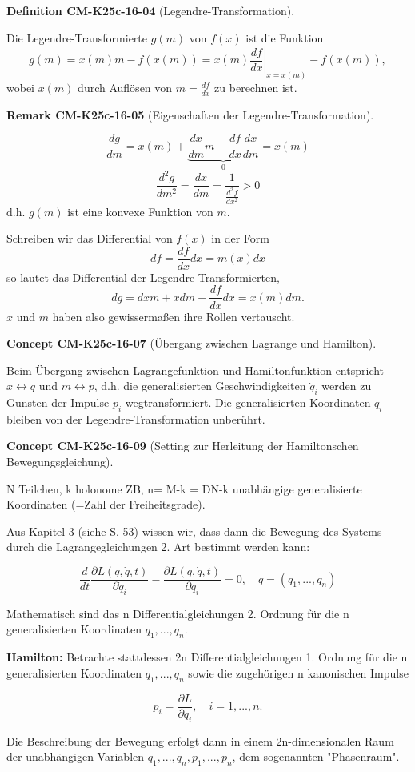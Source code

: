 \documentclass[10pt, letterpaper]{article}
\newcommand{\CustomHeading}[3]{%
  \par\medskip\noindent%
  \textbf{#1 #2} \textnormal{(#3)}.\enskip%
}
\newenvironment{DEF}[2]{\CustomHeading{Definition}{#1}{#2}}{}
\newenvironment{REM}[2]{\CustomHeading{Remark}{#1}{#2}}{}
\newenvironment{CONC}[2]{\CustomHeading{Concept}{#1}{#2}}{}
\begin{document}
\begin{DEF}{CM-K25c-16-04}{Legendre-Transformation}
Die Legendre-Transformierte $g(m)$ von $f(x)$ ist die Funktion
\[
g(m) = x(m)m - f(x(m)) = x(m)\left.\frac{df}{dx}\right|_{x=x(m)} - f(x(m)),
\]
wobei $x(m)$ durch Auflösen von $m = \frac{df}{dx}$ zu berechnen ist.
\end{DEF}

\begin{REM}{CM-K25c-16-05}{Eigenschaften der Legendre-Transformation}
\[
\frac{dg}{dm} = x(m) + \underbrace{\frac{dx}{dm}m - \frac{df}{dx}\frac{dx}{dm}}_{0} = x(m)
\]
\[
\frac{d^2g}{dm^2} = \frac{dx}{dm} = \frac{1}{\frac{d^2f}{dx^2}} > 0
\]
d.h. $g(m)$ ist eine konvexe Funktion von $m$.

Schreiben wir das Differential von $f(x)$ in der Form
\[
df = \frac{df}{dx}dx = m(x)dx
\]
so lautet das Differential der Legendre-Transformierten,
\[
dg = dxm + xdm - \frac{df}{dx}dx = x(m)dm.
\]
$x$ und $m$ haben also gewissermaßen ihre Rollen vertauscht.
\end{REM}

\begin{CONC}{CM-K25c-16-07}{Übergang zwischen Lagrange und Hamilton}
Beim Übergang zwischen Lagrangefunktion und Hamiltonfunktion entspricht $x \leftrightarrow q$ und $m \leftrightarrow p$, d.h. die generalisierten Geschwindigkeiten $\dot{q}_i$ werden zu Gunsten der Impulse $p_i$ wegtransformiert. Die generalisierten Koordinaten $q_i$ bleiben von der Legendre-Transformation unberührt.
\end{CONC}

\begin{CONC}{CM-K25c-16-09}{Setting zur Herleitung der Hamiltonschen Bewegungsgleichung}
N Teilchen, k holonome ZB, n= M-k = DN-k unabhängige generalisierte Koordinaten (=Zahl der Freiheitsgrade).

Aus Kapitel 3 (siehe S. 53) wissen wir, dass dann die Bewegung des Systems durch die Lagrangegleichungen 2. Art bestimmt werden kann:

\[
\frac{d}{dt} \frac{\partial L(q,\dot{q},t)}{\partial \dot{q}_i} - \frac{\partial L(q,\dot{q},t)}{\partial q_i} = 0, \quad q=(q_1,...,q_n)
\]

Mathematisch sind das n Differentialgleichungen 2. Ordnung für die n generalisierten Koordinaten $q_1,...,q_n$.

\textbf{Hamilton:} Betrachte stattdessen 2n Differentialgleichungen 1. Ordnung für die n generalisierten Koordinaten $q_1,...,q_n$ sowie die zugehörigen n kanonischen Impulse

\[
p_i = \frac{\partial L}{\partial \dot{q}_i}, \quad i=1,...,n.
\]

Die Beschreibung der Bewegung erfolgt dann in einem 2n-dimensionalen Raum der unabhängigen Variablen $q_1,...,q_n,p_1,...,p_n$, dem sogenannten "Phasenraum".
\end{CONC}
\end{document}
